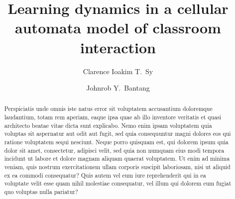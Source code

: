 \documentclass[10pt,a4paper,twoside]{article}
\begin{document}
\title{\TitleFont Learning dynamics in a cellular automata model of classroom interaction}


\author[*\negthickspace]{Clarence Ioakim T.~Sy}
\author[ ]{Johnrob Y.~Bantang
\lastauthorsep}





\begin{abstract}
\noindent
Perspiciatis unde omnis iste natus error sit voluptatem accusantium doloremque laudantium, totam rem aperiam, eaque ipsa quae ab illo inventore veritatis et quasi architecto beatae vitae dicta sunt explicabo. Nemo enim ipsam voluptatem quia voluptas sit aspernatur aut odit aut fugit, sed quia consequuntur magni dolores eos qui ratione voluptatem sequi nesciunt. Neque porro quisquam est, qui dolorem ipsum quia dolor sit amet, consectetur, adipisci velit, sed quia non numquam eius modi tempora incidunt ut labore et dolore magnam aliquam quaerat voluptatem. Ut enim ad minima veniam, quis nostrum exercitationem ullam corporis suscipit laboriosam, nisi ut aliquid ex ea commodi consequatur? Quis autem vel eum iure reprehenderit qui in ea voluptate velit esse quam nihil molestiae consequatur, vel illum qui dolorem eum fugiat quo voluptas nulla pariatur?


\end{abstract}
\end{document}
